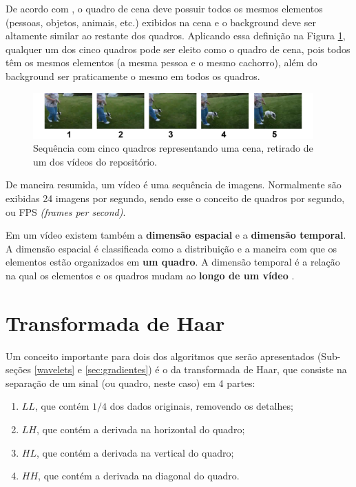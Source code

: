 	De acordo com \citeauthor{mao2015sceneframe}, o quadro de cena deve possuir todos os mesmos elementos (pessoas, objetos, animais, etc.) exibidos na cena e o background deve ser altamente similar ao restante dos quadros. Aplicando essa definição na Figura \ref{fig:quadro_cena}, qualquer um dos cinco quadros pode ser eleito como o quadro de cena, pois todos têm os mesmos elementos (a mesma pessoa e o mesmo cachorro), além do background ser praticamente o mesmo em todos os quadros.

 \begin{figure}[h]
      \centering
      \includegraphics[width=0.96\textwidth]{dados/figuras/keyframe.png}
      \caption{Sequência com cinco quadros representando uma cena, retirado de um dos vídeos do repositório.}
       	\label{fig:quadro_cena}
    \end{figure}   
    
    De maneira resumida, um vídeo é uma sequência de imagens. Normalmente são exibidas 24 imagens por segundo, sendo esse o conceito de quadros por segundo, ou FPS \textit{(frames per second)}. 
    
    Em um vídeo existem também a \textbf{dimensão espacial} e a \textbf{dimensão temporal}. A dimensão espacial é classificada como a distribuição e a maneira com que os elementos estão organizados em \textbf{um quadro}. A dimensão temporal é a relação na qual os elementos e os quadros mudam ao \textbf{longo de um vídeo} \citeauthor{hampapur2001comparison}.
    
\section{Transformada de Haar}

Um conceito importante para dois dos algoritmos que serão apresentados (Sub-seções  \ref{wavelets} e \ref{sec:gradientes}) é o da transformada de Haar, que consiste na separação de um sinal (ou quadro, neste caso) em 4 partes: 

\begin{enumerate}
\item $LL$, que contém $1/4$ dos dados originais, removendo os detalhes;
\item $LH$, que contém a derivada na horizontal do quadro;
\item $HL$, que contém a derivada na vertical do quadro;
\item $HH$, que contém a derivada na diagonal do quadro.
\end{enumerate}

